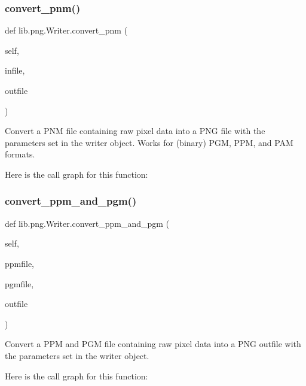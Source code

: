 \subsubsection{\texorpdfstring{convert\+\_\+pnm()}{convert\_pnm()}}
{\footnotesize\ttfamily def lib.\+png.\+Writer.\+convert\+\_\+pnm (\begin{DoxyParamCaption}\item[{}]{self,  }\item[{}]{infile,  }\item[{}]{outfile }\end{DoxyParamCaption})}

\begin{DoxyVerb}Convert a PNM file containing raw pixel data into a PNG file
with the parameters set in the writer object.  Works for
(binary) PGM, PPM, and PAM formats.
\end{DoxyVerb}
 Here is the call graph for this function\+:
\mbox{\label{classlib_1_1png_1_1_writer_a2eb6764944859e75490ac1a2c9e6659a}} 
\subsubsection{\texorpdfstring{convert\+\_\+ppm\+\_\+and\+\_\+pgm()}{convert\_ppm\_and\_pgm()}}
{\footnotesize\ttfamily def lib.\+png.\+Writer.\+convert\+\_\+ppm\+\_\+and\+\_\+pgm (\begin{DoxyParamCaption}\item[{}]{self,  }\item[{}]{ppmfile,  }\item[{}]{pgmfile,  }\item[{}]{outfile }\end{DoxyParamCaption})}

\begin{DoxyVerb}Convert a PPM and PGM file containing raw pixel data into a
PNG outfile with the parameters set in the writer object.
\end{DoxyVerb}
 Here is the call graph for this function\+:
\mbox{\label{classlib_1_1png_1_1_writer_af3ab4c859006ffd1a0e6abd49e5212c6}} 

